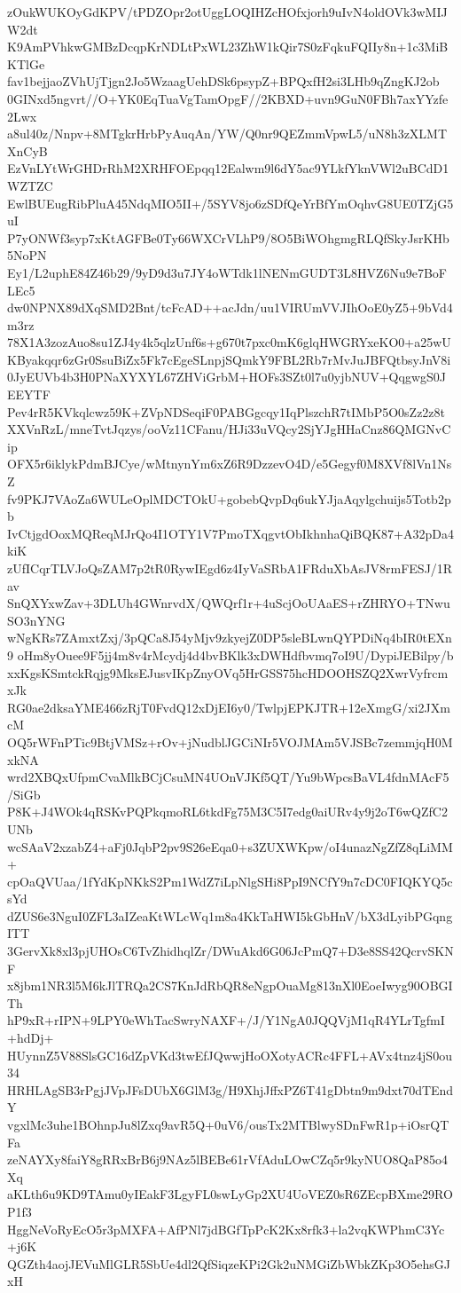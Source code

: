 zOukWUKOyGdKPV/tPDZOpr2otUggLOQIHZcHOfxjorh9uIvN4oldOVk3wMIJW2dt
K9AmPVhkwGMBzDcqpKrNDLtPxWL23ZhW1kQir7S0zFqkuFQIIy8n+1c3MiBKTlGe
fav1bejjaoZVhUjTjgn2Jo5WzaagUehDSk6psypZ+BPQxfH2si3LHb9qZngKJ2ob
0GINxd5ngvrt//O+YK0EqTuaVgTamOpgF//2KBXD+uvn9GuN0FBh7axYYzfe2Lwx
a8ul40z/Nnpv+8MTgkrHrbPyAuqAn/YW/Q0nr9QEZmmVpwL5/uN8h3zXLMTXnCyB
EzVnLYtWrGHDrRhM2XRHFOEpqq12Ealwm9l6dY5ac9YLkfYknVWl2uBCdD1WZTZC
EwlBUEugRibPluA45NdqMIO5II+/5SYV8jo6zSDfQeYrBfYmOqhvG8UE0TZjG5uI
P7yONWf3syp7xKtAGFBe0Ty66WXCrVLhP9/8O5BiWOhgmgRLQfSkyJsrKHb5NoPN
Ey1/L2uphE84Z46b29/9yD9d3u7JY4oWTdk1lNENmGUDT3L8HVZ6Nu9e7BoFLEc5
dw0NPNX89dXqSMD2Bnt/tcFcAD++acJdn/uu1VIRUmVVJIhOoE0yZ5+9bVd4m3rz
78X1A3zozAuo8su1ZJ4y4k5qlzUnf6s+g670t7pxc0mK6glqHWGRYxeKO0+a25wU
KByakqqr6zGr0SsuBiZx5Fk7cEgeSLnpjSQmkY9FBL2Rb7rMvJuJBFQtbsyJnV8i
0JyEUVb4b3H0PNaXYXYL67ZHViGrbM+HOFs3SZt0l7u0yjbNUV+QqgwgS0JEEYTF
Pev4rR5KVkqlcwz59K+ZVpNDSeqiF0PABGgcqy1IqPlszchR7tIMbP5O0sZz2z8t
XXVnRzL/mneTvtJqzys/ooVz11CFanu/HJi33uVQcy2SjYJgHHaCnz86QMGNvCip
OFX5r6iklykPdmBJCye/wMtnynYm6xZ6R9DzzevO4D/e5Gegyf0M8XVf8lVn1NsZ
fv9PKJ7VAoZa6WULeOplMDCTOkU+gobebQvpDq6ukYJjaAqylgchuijs5Totb2pb
IvCtjgdOoxMQReqMJrQo4I1OTY1V7PmoTXqgvtObIkhnhaQiBQK87+A32pDa4kiK
zUfICqrTLVJoQsZAM7p2tR0RywIEgd6z4IyVaSRbA1FRduXbAsJV8rmFESJ/1Rav
SnQXYxwZav+3DLUh4GWnrvdX/QWQrf1r+4uScjOoUAaES+rZHRYO+TNwuSO3nYNG
wNgKRs7ZAmxtZxj/3pQCa8J54yMjv9zkyejZ0DP5sleBLwnQYPDiNq4bIR0tEXn9
oHm8yOuee9F5jj4m8v4rMcydj4d4bvBKlk3xDWHdfbvmq7oI9U/DypiJEBilpy/b
xxKgsKSmtckRqjg9MksEJusvIKpZnyOVq5HrGSS75hcHDOOHSZQ2XwrVyfrcmxJk
RG0ae2dksaYME466zRjT0FvdQ12xDjEI6y0/TwlpjEPKJTR+12eXmgG/xi2JXmcM
OQ5rWFnPTic9BtjVMSz+rOv+jNudblJGCiNIr5VOJMAm5VJSBc7zemmjqH0MxkNA
wrd2XBQxUfpmCvaMlkBCjCsuMN4UOnVJKf5QT/Yu9bWpcsBaVL4fdnMAcF5/SiGb
P8K+J4WOk4qRSKvPQPkqmoRL6tkdFg75M3C5I7edg0aiURv4y9j2oT6wQZfC2UNb
wcSAaV2xzabZ4+aFj0JqbP2pv9S26eEqa0+s3ZUXWKpw/oI4unazNgZfZ8qLiMM+
cpOaQVUaa/1fYdKpNKkS2Pm1WdZ7iLpNlgSHi8PpI9NCfY9n7cDC0FIQKYQ5csYd
dZUS6e3NguI0ZFL3aIZeaKtWLcWq1m8a4KkTaHWI5kGbHnV/bX3dLyibPGqngITT
3GervXk8xl3pjUHOsC6TvZhidhqlZr/DWuAkd6G06JcPmQ7+D3e8SS42QcrvSKNF
x8jbm1NR3l5M6kJlTRQa2CS7KnJdRbQR8eNgpOuaMg813nXl0EoeIwyg90OBGITh
hP9xR+rIPN+9LPY0eWhTacSwryNAXF+/J/Y1NgA0JQQVjM1qR4YLrTgfmI+hdDj+
HUynnZ5V88SlsGC16dZpVKd3twEfJQwwjHoOXotyACRc4FFL+AVx4tnz4jS0ou34
HRHLAgSB3rPgjJVpJFsDUbX6GlM3g/H9XhjJffxPZ6T41gDbtn9m9dxt70dTEndY
vgxlMc3uhe1BOhnpJu8lZxq9avR5Q+0uV6/ousTx2MTBlwySDnFwR1p+iOsrQTFa
zeNAYXy8faiY8gRRxBrB6j9NAz5lBEBe61rVfAduLOwCZq5r9kyNUO8QaP85o4Xq
aKLth6u9KD9TAmu0yIEakF3LgyFL0swLyGp2XU4UoVEZ0sR6ZEcpBXme29ROP1f3
HggNeVoRyEcO5r3pMXFA+AfPNl7jdBGfTpPcK2Kx8rfk3+la2vqKWPhmC3Yc+j6K
QGZth4aojJEVuMlGLR5SbUe4dl2QfSiqzeKPi2Gk2uNMGiZbWbkZKp3O5ehsGJxH

